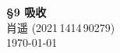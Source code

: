 \documentclass[11pt,a4paper]{article}
\title{\myhwtype}
\author{\myname}
\newcommand{\myname}{肖遥} %
\newcommand{\myUCO}{2021\,1414\,90279} %
\newcommand{\myhwtype}{\textbf{\S 9 吸收}}
\begin{document}
	\thispagestyle{plain}
	\begin{center}
		{\Large \fontsize{16pt}{18pt}\selectfont \myhwtype{} } \\
		\myname{} (\myUCO{}) \\
		\today
	\end{center}
\end{document}
